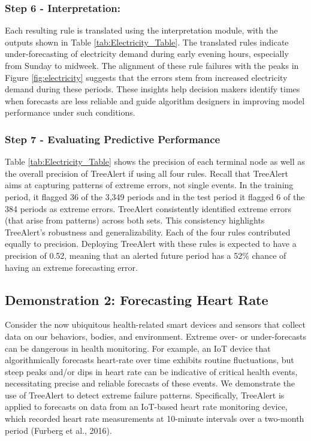 \documentclass[ijds,sglanonrev]{informs4}
\begin{document}
\subsubsection*{Step 6 - Interpretation:}
Each resulting rule is translated using the interpretation module, with the outputs shown in Table \ref{tab:Electricity_Table}. The translated rules indicate under-forecasting of electricity demand during early evening hours, especially from Sunday to midweek. The alignment of these rule failures with the peaks in Figure \ref{fig:electricity} suggests that the errors stem from increased electricity demand during these periods. These insights help decision makers identify times when forecasts are less reliable and guide algorithm designers in improving model performance under such conditions.

\subsubsection*{Step 7 - Evaluating Predictive Performance}
Table \ref{tab:Electricity_Table} shows the precision of each terminal node as well as the overall precision of TreeAlert if using all four rules. Recall that TreeAlert aims at capturing patterns of extreme errors, not single events. In the training period, it flagged 36 of the 3,349 periods and in the test period it flagged 6 of the 384 periods as extreme errors. TreeAlert consistently identified extreme errors (that arise from patterns) across both sets. This consistency highlights TreeAlert's robustness and generalizability. Each of the four rules contributed equally to precision. Deploying TreeAlert with these rules is expected to have a precision of 0.52, meaning that an alerted future period has a 52\% chance of having an extreme forecasting error.

\subsection{Demonstration 2: Forecasting Heart Rate}

Consider the now ubiquitous health-related smart devices and sensors that collect data on our behaviors, bodies, and environment. Extreme over- or under-forecasts can be dangerous in health monitoring. For example, an IoT device that algorithmically forecasts heart-rate over time exhibits routine fluctuations, but steep peaks and/or dips in heart rate can be indicative of critical health events, necessitating precise and reliable forecasts of these events. We demonstrate the use of TreeAlert to detect extreme failure patterns. Specifically, TreeAlert is applied to forecasts on data from an IoT-based heart rate monitoring device, which recorded heart rate measurements at 10-minute intervals over a two-month period (Furberg et al., 2016). 
\end{document}
